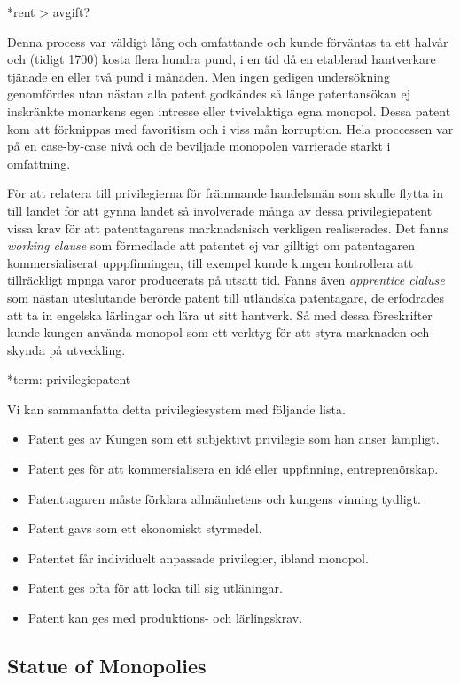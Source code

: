 *rent > avgift?

Denna process var väldigt lång och omfattande och kunde
förväntas ta ett halvår och (tidigt 1700) kosta flera hundra pund, i en tid då en etablerad hantverkare tjänade en eller två pund i månaden. \cite{macleod}
Men ingen gedigen undersökning genomfördes utan nästan alla patent godkändes så
länge patentansökan ej inskränkte monarkens egen intresse eller tvivelaktiga egna monopol. 
Dessa patent kom att förknippas med favoritism och i viss mån korruption. Hela proccessen var på en
case-by-case nivå och de beviljade monopolen varrierade starkt i omfattning\cite{bracha}.

För att relatera till privilegierna för främmande handelsmän som skulle flytta in till landet för att
gynna landet så involverade många av dessa privilegiepatent vissa krav för att patenttagarens marknadsnisch verkligen realiserades. Det fanns \emph{working clause} som förmedlade att patentet ej var
gilltigt om patentagaren kommersialiserat upppfinningen, till exempel kunde kungen kontrollera att
tillräckligt mpnga varor producerats på utsatt tid. Fanns även \emph{apprentice claluse} som nästan
uteslutande berörde patent till utländska patentagare, de erfodrades att ta in engelska lärlingar och
lära ut sitt hantverk. Så med dessa föreskrifter kunde kungen använda monopol som ett verktyg för att styra marknaden och skynda på utveckling.\cite{bracha}

*term: privilegiepatent

Vi kan sammanfatta detta privilegiesystem med följande lista.
\begin{itemize}
	\item Patent ges av Kungen som ett subjektivt privilegie som han anser lämpligt.
	\item Patent ges för att kommersialisera en idé eller uppfinning, entreprenörskap.
	\item Patenttagaren måste förklara allmänhetens och kungens vinning tydligt.
	\item Patent gavs som ett ekonomiskt styrmedel.
	\item Patentet får individuelt anpassade privilegier, ibland monopol.
	\item Patent ges ofta för att locka till sig utläningar.
	\item Patent kan ges med produktions- och lärlingskrav.
\end{itemize}


\subsection{Statue of Monopolies} 
\label{sub:statue_of_monopolies}

